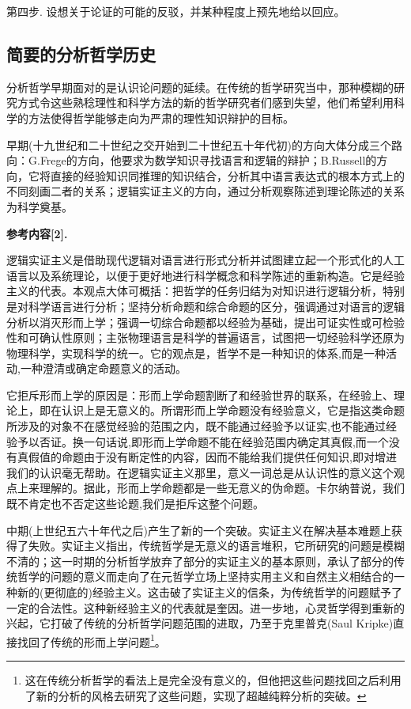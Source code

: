 \documentclass{article}
\begin{document}
{\kaishu 第四步.} 设想关于论证的可能的反驳，并某种程度上预先地给以回应。

\subsection{简要的分析哲学历史}
分析哲学早期面对的是认识论问题的延续。在传统的哲学研究当中，那种模糊的研究方式令这些熟稔理性和科学方法的新的哲学研究者们感到失望，他们希望利用科学的方法使得哲学能够走向为严肃的理性知识辩护的目标。

早期(十九世纪和二十世纪之交开始到二十世纪五十年代初)的方向大体分成三个路向：G.Frege的方向，他要求为数学知识寻找语言和逻辑的辩护；B.Russell的方向，它将直接的经验知识同推理的知识结合，分析其中语言表达式的根本方式上的不同刻画二者的关系；逻辑实证主义的方向，通过分析观察陈述到理论陈述的关系为科学奠基。

\textbf{\kaishu 参考内容[2].} \ {\kaishu 逻辑实证主义是借助现代逻辑对语言进行形式分析并试图建立起一个形式化的人工语言以及系统理论，以便于更好地进行科学概念和科学陈述的重新构造。它是经验主义的代表。本观点大体可概括：把哲学的任务归结为对知识进行逻辑分析，特别是对科学语言进行分析；坚持分析命题和综合命题的区分，强调通过对语言的逻辑分析以消灭形而上学；强调一切综合命题都以经验为基础，提出可证实性或可检验性和可确认性原则；主张物理语言是科学的普遍语言，试图把一切经验科学还原为物理科学，实现科学的统一。它的观点是，哲学不是一种知识的体系,而是一种活动,一种澄清或确定命题意义的活动。

它拒斥形而上学的原因是：形而上学命题割断了和经验世界的联系，在经验上、理论上，即在认识上是无意义的。所谓形而上学命题没有经验意义，它是指这类命题所涉及的对象不在感觉经验的范围之内，既不能通过经验予以证实,也不能通过经验予以否证。换一句话说,即形而上学命题不能在经验范围内确定其真假,而一个没有真假值的命题由于没有断定性的内容，因而不能给我们提供任何知识,即对增进我们的认识毫无帮助。在逻辑实证主义那里，意义一词总是从认识性的意义这个观点上来理解的。据此，形而上学命题都是一些无意义的伪命题。卡尔纳普说，我们既不肯定也不否定这些论题,我们是拒斥这整个问题。}

中期(上世纪五六十年代之后)产生了新的一个突破。实证主义在解决基本难题上获得了失败。实证主义指出，传统哲学是无意义的语言堆积，它所研究的问题是模糊不清的；这一时期的分析哲学放弃了部分的实证主义的基本原则，承认了部分的传统哲学的问题的意义而走向了在元哲学立场上坚持实用主义和自然主义相结合的一种新的(更彻底的)经验主义。这击破了实证主义的信条，为传统哲学的问题赋予了一定的合法性。这种新经验主义的代表就是奎因。进一步地，心灵哲学得到重新的兴起，它打破了传统的分析哲学问题范围的进取，乃至于克里普克(Saul Kripke)直接找回了传统的形而上学问题\footnote{这在传统分析哲学的看法上是完全没有意义的，但他把这些问题找回之后利用了新的分析的风格去研究了这些问题，实现了超越纯粹分析的突破。}。
\end{document}
